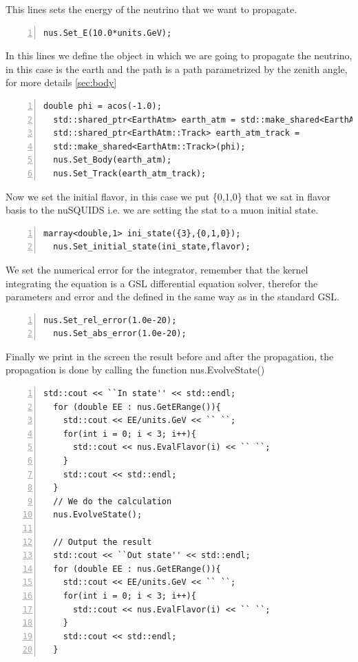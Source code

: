 This lines sets the energy of the neutrino that we want to propagate.
\begin{lstlisting}[frame=leftline, numbers = left,breaklines=true, label = ex:sin1,firstnumber=last]
  nus.Set_E(10.0*units.GeV);
\end{lstlisting}

In this lines we define the object in which we are going to propagate
the neutrino, in this case is the earth and the path is a path
parametrized by the zenith angle, for more details \ref{sec:body}
\begin{lstlisting}[frame=leftline, numbers = left,breaklines=true, label = ex:sin1,firstnumber=last]
  double phi = acos(-1.0);
  std::shared_ptr<EarthAtm> earth_atm = std::make_shared<EarthAtm>();
  std::shared_ptr<EarthAtm::Track> earth_atm_track =
  std::make_shared<EarthAtm::Track>(phi);
  nus.Set_Body(earth_atm);
  nus.Set_Track(earth_atm_track);
\end{lstlisting}
Now we set the initial flavor, in this case we put {\ttf\{0,1,0\}}
that we sat in flavor basis to the nuSQUIDS i.e. we are setting the
stat to a muon initial state.

\begin{lstlisting}[frame=leftline, numbers = left,breaklines=true, label = ex:sin1,firstnumber=last]
  marray<double,1> ini_state({3},{0,1,0});
  nus.Set_initial_state(ini_state,flavor);
\end{lstlisting}

We set the numerical error for the integrator, remember that the
kernel integrating the equation is a GSL differential equation solver,
therefor the parameters and error and the defined in the same way as
in the standard GSL.
\begin{lstlisting}[frame=leftline, numbers = left,breaklines=true, label = ex:sin1,firstnumber=last]
  nus.Set_rel_error(1.0e-20);
  nus.Set_abs_error(1.0e-20);
\end{lstlisting}

Finally we print in the screen the result before and after the
propagation, the propagation is done by calling the function  {\ttf
  nus.EvolveState()} 
\begin{lstlisting}[frame=leftline, numbers = left,breaklines=true, label = ex:sin1,firstnumber=last]
  std::cout << ``In state'' << std::endl;
  for (double EE : nus.GetERange()){
    std::cout << EE/units.GeV << `` ``;
    for(int i = 0; i < 3; i++){
      std::cout << nus.EvalFlavor(i) << `` ``;
    }
    std::cout << std::endl;
  }
  // We do the calculation                                                                                  
  nus.EvolveState();
  
  // Output the result                                                                                 
  std::cout << ``Out state'' << std::endl;
  for (double EE : nus.GetERange()){
    std::cout << EE/units.GeV << `` ``;
    for(int i = 0; i < 3; i++){
      std::cout << nus.EvalFlavor(i) << `` ``;
    }
    std::cout << std::endl;
  }
\end{lstlisting}


